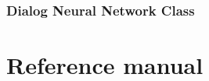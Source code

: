 \documentclass[11pt,fleqn,,a4paper,twoside,openright]{book}
\begin{document}
\subsection*{Dialog Neural Network Class}



\chapter{Reference manual}\label{app:refManual}

\end{document}
